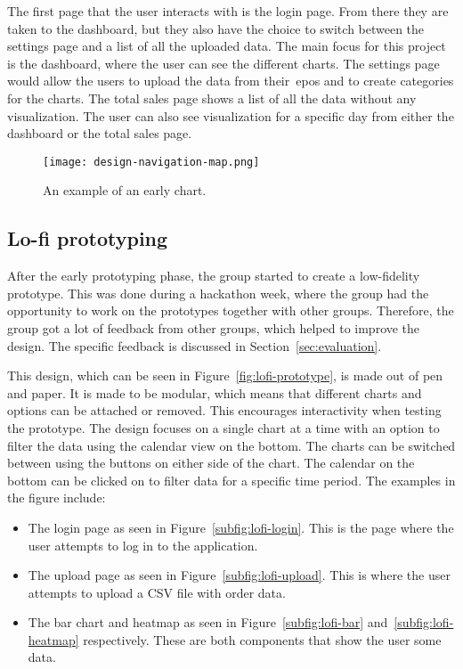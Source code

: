 The first page that the user interacts with is the login page.
From there they are taken to the dashboard, but they also have the choice to switch between the settings page and a list
of all the uploaded data.
The main focus for this project is the dashboard, where the user can see the different charts.
The settings page would allow the users to upload the data from their~\acrshort{epos} and to create categories for the
charts.
The total sales page shows a list of all the data without any visualization.
The user can also see visualization for a specific day from either the dashboard or the total sales page.

\begin{figure}[H]
    \centering
    \texttt{[image: design-navigation-map.png]}
    \caption{An example of an early chart.
    }\label{fig:navigation-map}
\end{figure}

\subsection{Lo-fi prototyping}\label{subsec:lo-fi-prototyping}

After the early prototyping phase, the group started to create a low-fidelity prototype.
This was done during a hackathon week, where the group had the opportunity to work on the prototypes together with
other groups.
Therefore, the group got a lot of feedback from other groups, which helped to improve the design.
The specific feedback is discussed in Section~\ref{sec:evaluation}.

This design, which can be seen in Figure~\ref{fig:lofi-prototype}, is made out of pen and paper.
It is made to be modular, which means that different charts and options can be attached or removed.
This encourages interactivity when testing the prototype.
The design focuses on a single chart at a time with an option to filter
the data using the calendar view on the bottom.
The charts can be switched between using the buttons on either side of the chart.
The calendar on the bottom can be clicked on to filter data for a specific time period.
The examples in the figure include:

\begin{itemize}
    \item The login page as seen in Figure~\ref{subfig:lofi-login}.
    This is the page where the user attempts to log in to the application.
    \item The upload page as seen in Figure~\ref{subfig:lofi-upload}.
    This is where the user attempts to upload a CSV file with order data.
    \item The bar chart and heatmap as seen in Figure~\ref{subfig:lofi-bar} and~\ref{subfig:lofi-heatmap} respectively.
    These are both components that show the user some data.
\end{itemize}

